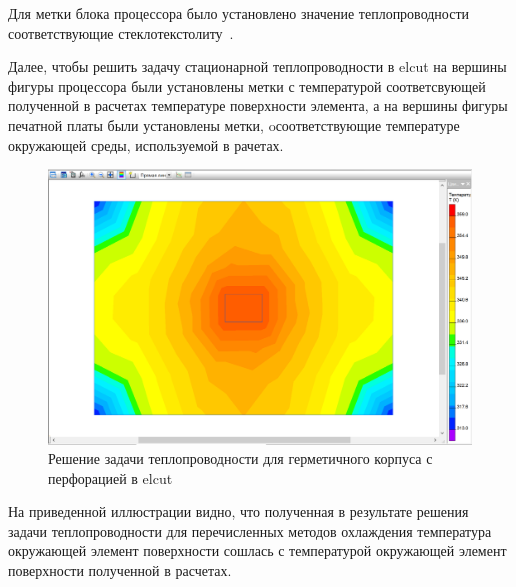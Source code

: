 Для метки блока процессора было установлено значение теплопроводности
соответствующие стеклотекстолиту~\cite{teplotim}.

Далее, чтобы решить задачу стационарной теплопроводности в elcut на
вершины фигуры процессора были установлены метки с температурой
соответсвующей полученной в расчетах температуре поверхности элемента,
а на вершины фигуры печатной платы были установлены метки,
oсоответствующие температуре окружающей среды, используемой в рачетах.

\begin{figure}[h]
  \centering
  \includegraphics[scale = 0.3]{images2/elcut_calculate_with_temp_6.png}
  \caption{ Решение задачи теплопроводности для герметичного корпуса с перфорацией в elcut }
\end{figure}

На приведенной иллюстрации видно, что полученная в результате решения
задачи теплопроводности для перечисленных методов охлаждения
температура окружающей элемент поверхности
сошлась с температурой окружающей элемент поверхности полученной в
расчетах.


